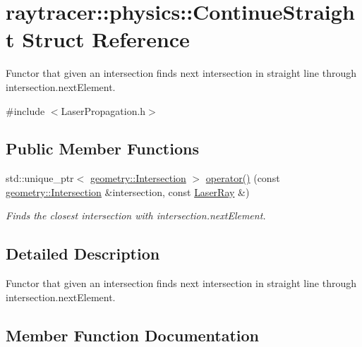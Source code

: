 \hypertarget{structraytracer_1_1physics_1_1ContinueStraight}{}\section{raytracer\+:\+:physics\+:\+:Continue\+Straight Struct Reference}
\label{structraytracer_1_1physics_1_1ContinueStraight}


Functor that given an intersection finds next intersection in straight line through intersection.\+next\+Element.  




{\ttfamily \#include $<$Laser\+Propagation.\+h$>$}

\subsection*{Public Member Functions}
\begin{DoxyCompactItemize}
\item 
std\+::unique\+\_\+ptr$<$ \hyperlink{structraytracer_1_1geometry_1_1Intersection}{geometry\+::\+Intersection} $>$ \hyperlink{structraytracer_1_1physics_1_1ContinueStraight_a6b39477b6d24789cc4c98044a556e367}{operator()} (const \hyperlink{structraytracer_1_1geometry_1_1Intersection}{geometry\+::\+Intersection} \&intersection, const \hyperlink{structraytracer_1_1physics_1_1LaserRay}{Laser\+Ray} \&)
\begin{DoxyCompactList}\small\item\em Finds the closest intersection with intersection.\+next\+Element. \end{DoxyCompactList}\end{DoxyCompactItemize}


\subsection{Detailed Description}
Functor that given an intersection finds next intersection in straight line through intersection.\+next\+Element. 

\subsection{Member Function Documentation}
\mbox{\label{structraytracer_1_1physics_1_1ContinueStraight_a6b39477b6d24789cc4c98044a556e367}} 
